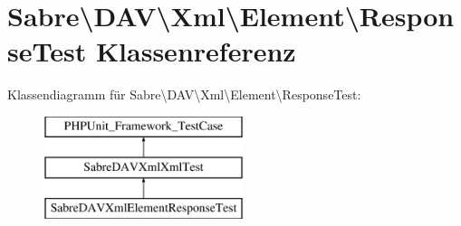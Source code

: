 \hypertarget{class_sabre_1_1_d_a_v_1_1_xml_1_1_element_1_1_response_test}{}\section{Sabre\textbackslash{}D\+AV\textbackslash{}Xml\textbackslash{}Element\textbackslash{}Response\+Test Klassenreferenz}
\label{class_sabre_1_1_d_a_v_1_1_xml_1_1_element_1_1_response_test}
Klassendiagramm für Sabre\textbackslash{}D\+AV\textbackslash{}Xml\textbackslash{}Element\textbackslash{}Response\+Test\+:\begin{figure}[H]
\begin{center}
\leavevmode
\includegraphics[height=3.000000cm]{class_sabre_1_1_d_a_v_1_1_xml_1_1_element_1_1_response_test}
\end{center}
\end{figure}
